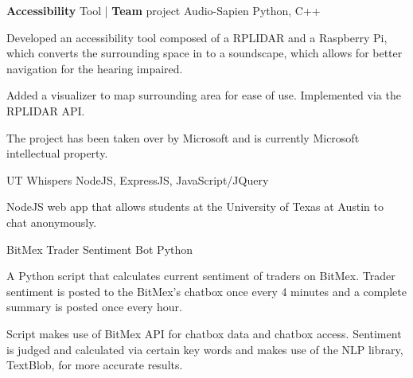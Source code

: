 

\begin{cventries}

  \cventry
    {\textbf{Accessibility} Tool   |   \textbf{Team} project } %
    {Audio-Sapien} %
    {Python, C++} %
    {
      \begin{cvitems} %
        \item {Developed an accessibility tool composed of a RPLIDAR and a Raspberry Pi, which converts the surrounding space in to a soundscape, which allows for better navigation for the hearing impaired.}
        \item {Added a visualizer to map surrounding area for ease of use. Implemented via the RPLIDAR API.}
        \item {The project has been taken over by Microsoft and is currently Microsoft intellectual property.}
      \end{cvitems}
    }

  \cventry
    {UT Whispers} %
    {NodeJS, ExpressJS, JavaScript/JQuery} %
    {
      \begin{cvitems} %
        \item {NodeJS web app that allows students at the University of Texas at Austin to chat anonymously.}
      \end{cvitems}
    }

  \cventry
    {BitMex Trader Sentiment Bot} %
    {Python} %
    {
      \begin{cvitems} %
        \item {A Python script that calculates current sentiment of traders on BitMex. Trader sentiment is posted to the BitMex's chatbox once every 4 minutes and a complete summary is posted once every hour.}
        \item {Script makes use of BitMex API for chatbox data and chatbox access. Sentiment is judged and calculated via certain key words and makes use of the NLP library, TextBlob, for more accurate results.}
      \end{cvitems}
    }


\end{cventries}
